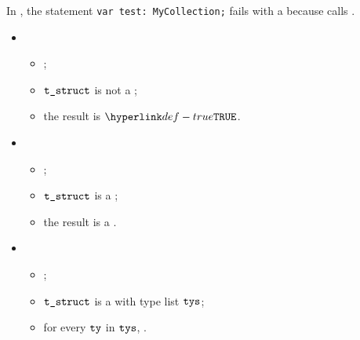 In , the statement
\verb|var test: MyCollection;| fails with a \typingerrorterm{} because
 calls .

\ProseParagraph
\OneApplies
\begin{itemize}
  \item
    \begin{itemize}
      \item \Prosemakeanonymous{\tenv}{\vt}{\vtstruct};
      \item $\texttt{t\_struct}$ is not a \collectiontypeterm{};
      \item the result is $\True$.
    \end{itemize}
  \item {}
    \begin{itemize}
      \item \Prosemakeanonymous{\tenv}{\vt}{\vtstruct};
      \item $\texttt{t\_struct}$ is a \collectiontypeterm{};
      \item the result is a \typingerrorterm{}.
    \end{itemize}
  \item {}
    \begin{itemize}
      \item \Prosemakeanonymous{\tenv}{\vt}{\vtstruct};
      \item $\texttt{t\_struct}$ is a \tupletypeterm{} with type list $\texttt{tys}$;
      \item for every $\texttt{ty}$ in $\texttt{tys}$, \Prosecheckisnotcollection{\tty}{\tenv}.
    \end{itemize}
\end{itemize}

